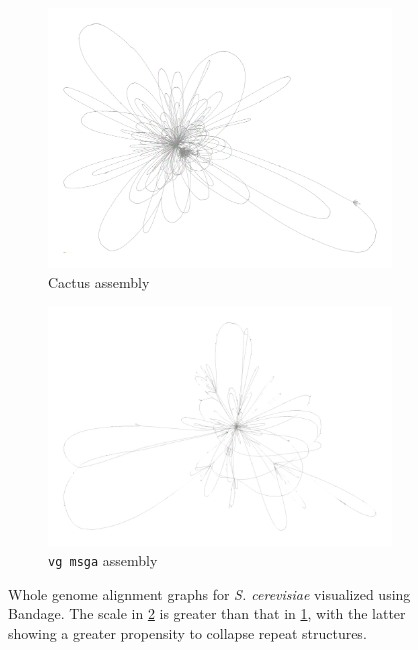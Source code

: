 \begin{figure}[htbp!]
  \begin{subfigure}[t]{0.9\textwidth}
    \includegraphics[width=1.0\textwidth]{Chapter3/Figs/cactus_yeast.png}
    \caption{Cactus assembly} \label{subfig:cactus_yeast_bandage}
  \end{subfigure}
  \begin{subfigure}[t]{0.9\textwidth}
    \includegraphics[width=1.0\textwidth]{Chapter3/Figs/vg_msga_yeast.png}
    \caption{{\tt vg msga} assembly} \label{subfig:msga_yeast_bandage}
  \end{subfigure}
  \caption[Whole genome alignment graphs for \emph{S. cerevisiae}]{
    Whole genome alignment graphs for \emph{S. cerevisiae} visualized using Bandage.
    The scale in \ref{subfig:msga_yeast_bandage} is greater than that in \ref{subfig:cactus_yeast_bandage}, with the latter showing a greater propensity to collapse repeat structures.
  }
  \label{fig:yeast_bandage}
\end{figure}

